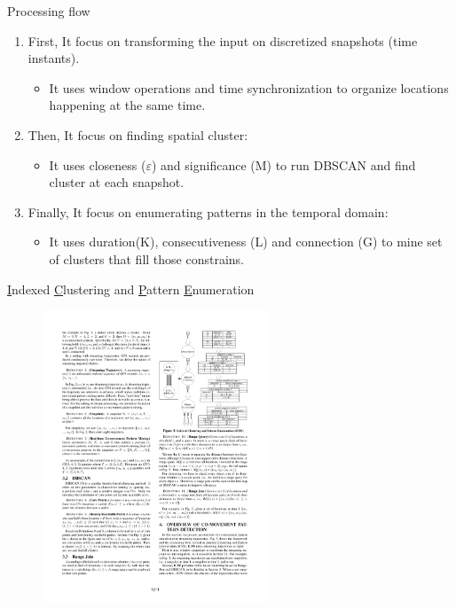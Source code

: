 \documentclass{beamer}
\begin{document}
\begin{frame}{Processing flow}
    \begin{enumerate}
        \item First, It focus on transforming the input on discretized snapshots (time instants).
        \begin{itemize}
            \item It uses window operations and time synchronization to organize locations happening at the same time.
        \end{itemize}
        \item Then, It focus on finding spatial cluster: 
        \begin{itemize}
            \item It uses closeness ($\varepsilon$) and significance (M) to run DBSCAN and find cluster at each snapshot.
        \end{itemize}
        \item Finally, It focus on enumerating patterns in the temporal domain:
        \begin{itemize}
            \item It uses duration(K), consecutiveness (L) and connection (G) to mine set of clusters that fill those constrains. 
        \end{itemize}
    \end{enumerate}
\end{frame}

\begin{frame}{\underline{I}ndexed \underline{C}lustering and \underline{P}attern \underline{E}numeration}
    \centering 
    \begin{figure}
        \includegraphics[trim=11cm 16.7cm 1.5cm 2cm, clip, width=0.6\textwidth]{figures/Chen_p1211}
    \end{figure}
\end{frame}
\end{document}
